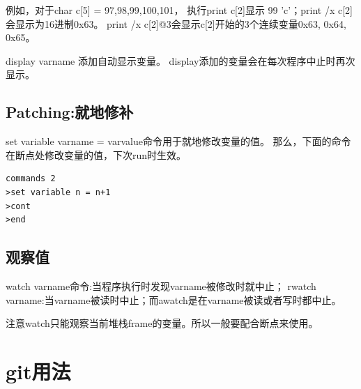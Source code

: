 例如，对于char c[5] = {97,98,99,100,101}，
执行print c[2]显示 99 'c'；print /x c[2]会显示为16进制0x63。
print /x c[2]@3会显示c[2]开始的3个连续变量{0x63, 0x64, 0x65}。

display varname 添加自动显示变量。
display添加的变量会在每次程序中止时再次显示。

\subsection{Patching:就地修补}
set variable varname = varvalue命令用于就地修改变量的值。
那么，下面的命令在断点处修改变量的值，下次run时生效。
\begin{verbatim}
commands 2
>set variable n = n+1
>cont
>end
\end{verbatim}


\subsection{观察值}
watch varname命令:当程序执行时发现varname被修改时就中止；
rwatch varname:当varname被读时中止；而awatch是在varname被读或者写时都中止。

注意watch只能观察当前堆栈frame的变量。所以一般要配合断点来使用。









































\section{git用法}

